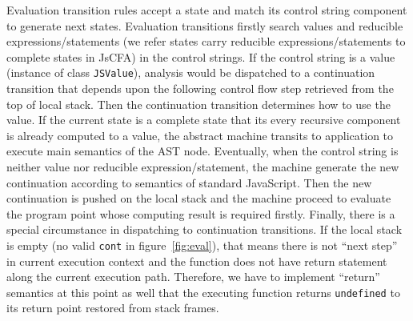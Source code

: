 \documentclass{article}
\begin{document}
Evaluation transition rules accept a state and match its control string component to generate next states. Evaluation transitions firstly search values and reducible expressions/statements (we refer states carry reducible expressions/statements to complete states in JsCFA) in the control strings.
If the control string is a value (instance of class \verb|JSValue|), analysis would be dispatched to a continuation transition that depends upon  the following control flow step retrieved from the top of local stack. Then the continuation transition determines how to use the value.
If the current state is a complete state that its every recursive component is already computed to a value, the abstract machine transits to application to execute main semantics of the AST node. Eventually, when the control string is neither value nor reducible expression/statement, the machine generate the new continuation according to semantics of standard JavaScript. Then the new continuation is pushed on the local stack and the machine proceed to evaluate the program point whose computing result is required firstly.
Finally, there is a special circumstance in dispatching to continuation transitions. If the local stack is empty (no valid \verb|cont| in figure~\ref{fig:eval}), that means there is not ``next step'' in current execution context and the function does not have return statement along the current execution path. Therefore, we have to implement ``return'' semantics at this point as well that the executing function returns \verb|undefined| to its return point restored from stack frames.
\end{document}
